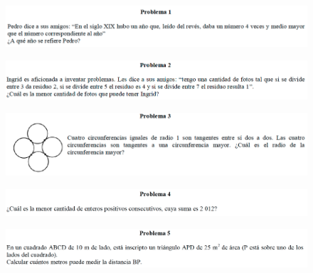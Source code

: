 \begin{figure}[H]
	\centering
	\includegraphics[width=\linewidth]{2020_05_23/imgs/OMAPA_2012_r5_M_1}
	\label{OMAPA_2012_r5_M_1}
\end{figure}

\begin{figure}[H]
	\centering
	\includegraphics[width=\linewidth]{2020_05_23/imgs/OMAPA_2012_r5_M_2}
	\label{OMAPA_2012_r5_M_2}
\end{figure}

\begin{figure}[H]
	\centering
	\includegraphics[width=\linewidth]{2020_05_23/imgs/OMAPA_2012_r5_M_3}
	\label{OMAPA_2012_r5_M_3}
\end{figure}

\begin{figure}[H]
	\centering
	\includegraphics[width=\linewidth]{2020_05_23/imgs/OMAPA_2012_r5_M_4}
	\label{OMAPA_2012_r5_M_4}
\end{figure}

\begin{figure}[H]
	\centering
	\includegraphics[width=\linewidth]{2020_05_23/imgs/OMAPA_2012_r5_M_5}
	\label{OMAPA_2012_r5_M_5}
\end{figure}


